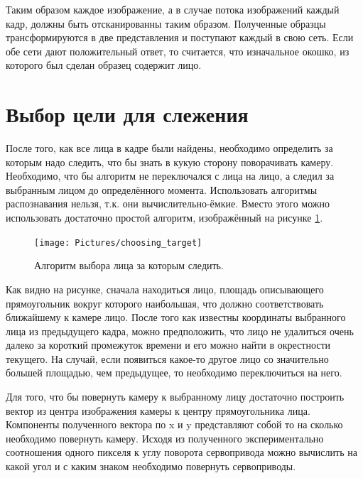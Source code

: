 \documentclass[12pt]{report}
\begin{document}
Таким образом каждое изображение, а в случае потока изображений каждый кадр, должны быть отсканированны таким образом. 
Полученные образцы трансформируются в две представления и поступают каждый в свою сеть. Если обе сети дают 
положительный ответ, то считается, что изначальное окошко, из которого был сделан образец содержит лицо.

\section{Выбор цели для слежения}
После того, как все лица в кадре были найдены, необходимо определить за которым надо следить, что бы знать в кукую 
сторону поворачивать камеру. Необходимо, что бы алгоритм не переключался с лица на лицо, а следил за выбранным лицом 
до определённого момента. Использовать алгоритмы распознавания нельзя, т.к. они вычислительно-ёмкие. Вместо этого 
можно использовать достаточно простой алгоритм, изображённый на рисунке \ref{fig:choosing_face}.

\begin{figure}[h]
	\centering
	\texttt{[image: Pictures/choosing\_target]}	
	\caption{Алгоритм выбора лица за которым следить.}
	\label{fig:choosing_face}
\end{figure}

Как видно на рисунке, сначала находиться лицо, площадь описывающего прямоугольник вокруг которого наибольшая, что 
должно соответствовать ближайшему к камере лицо. После того как известны координаты выбранного лица из предыдущего 
кадра, можно предположить, что лицо не удалиться очень далеко за короткий промежуток времени и его можно найти в 
окрестности текущего. На случай, если появиться какое-то другое лицо со значительно большей площадью, чем предыдущее, 
то необходимо переключиться на него. 

Для того, что бы повернуть камеру к выбранному лицу достаточно построить вектор из центра изображения камеры к центру  
прямоугольника лица. Компоненты полученного вектора по x и y представляют собой то на сколько необходимо повернуть 
камеру. Исходя из полученного экспериментально соотношения одного пикселя к углу поворота сервопривода можно 
вычислить на какой угол и с каким знаком необходимо повернуть сервоприводы.

\end{document}
